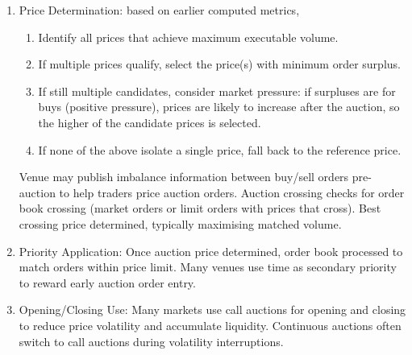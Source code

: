 \begin{definition}
\begin{enumerate}[label=\roman*.]
\begin{enumerate}[label=\arabic*.]
\item Executable Volume: minimum of cumulative buy and sell pressure at each price. Total volume that can cross is limited by the smaller side.
\item Order Surplus: amount of buy/sell pressure remain unexecuted from lack of orders on opposite side.
\item Market Pressure: sign of order surplus. Positive is surplus of buy orders; negative is surplus of sells.
\end{enumerate}
\item Price Determination: based on earlier computed metrics,
\begin{enumerate}[label=\arabic*.]
\setlength{\itemsep}{0pt}
\item Identify all prices that achieve maximum executable volume.
\item If multiple prices qualify, select the price(s) with minimum order surplus.
\item If still multiple candidates, consider market pressure: if surpluses are for buys (positive pressure), prices are likely to increase after the auction, so the higher of the candidate prices is selected.
\item If none of the above isolate a single price, fall back to the reference price.
\end{enumerate} 
Venue may publish imbalance information between buy/sell orders pre-auction to help traders price auction orders. Auction crossing checks for order book crossing (market orders or limit orders with prices that cross). Best crossing price determined, typically maximising matched volume.
\item Priority Application: Once auction price determined, order book processed to match orders within price limit. Many venues use time as secondary priority to reward early auction order entry.
\item Opening/Closing Use: Many markets use call auctions for opening and closing to reduce price volatility and accumulate liquidity. Continuous auctions often switch to call auctions during volatility interruptions.
\end{enumerate}
\end{definition}


